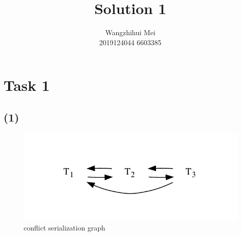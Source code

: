 \documentclass[12pt]{article}%
\begin{document}
\title{Solution 1}
\author{Wangzhihui Mei \\ 2019124044 6603385}
\date{}
\maketitle

\section*{Task 1}
\subsection*{(1)}
\begin{figure}[h]
    \centering
    \includegraphics[]{task1_1} 
    \caption{conflict  serialization  graph }
    \label{}
\end{figure}

\clearpage
\end{document}
